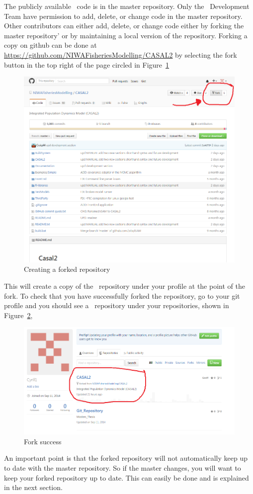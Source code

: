 The publicly available \CNAME\ code is in the master repository. Only the \CNAME\ Development Team have permission to add, delete, or change code in the master repository. Other contributors can either add, delete, or change code either by forking the master repository' or by maintaining a local version of the repository. Forking a copy on github can be done at \url{https://github.com/NIWAFisheriesModelling/CASAL2} by selecting the fork button in the top right of the page circled in Figure~\ref{fig:fork}

\begin{figure}[!ht]
	\centering
	\includegraphics[scale=0.6]{Figures/Fork_button.png}
	\caption{Creating a forked repository}\label{fig:fork}
\end{figure}
\pagebreak

This will create a copy of the \CNAME\ repository under your profile at the point of the fork. To check that you have successfully forked the repository, go to your git profile and you should see a \CNAME\ repository under your repositories, shown in Figure~\ref{fig:fork_success},

\begin{figure}[!ht]
	\centering
	\includegraphics[scale=0.6]{Figures/fork_success.png}
	\caption{Fork success}\label{fig:fork_success}
\end{figure}

An important point is that the forked repository will not automatically keep up to date with the master repository. So if the master changes, you will want to keep your forked repository up to date. This can easily be done and is explained in the next section.


